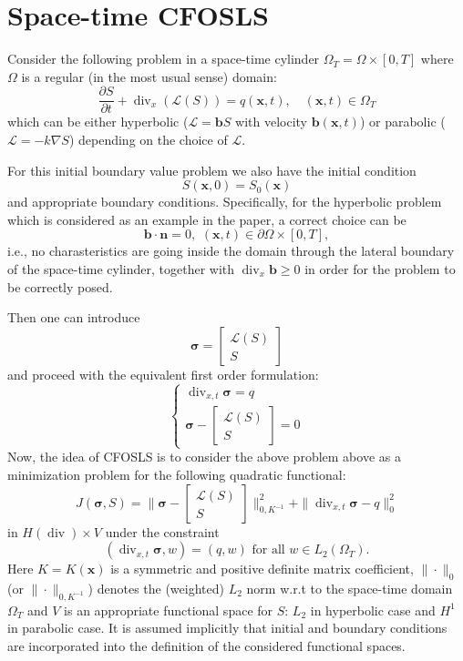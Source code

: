 \documentclass[12pt]{article}
\renewcommand{\div}{\operatorname{div}}
\def\bsigma{{\boldsymbol \sigma}}
\begin{document}
\section{Space-time CFOSLS}
Consider the following problem in a space-time cylinder $\Omega_T = \Omega \times [0, T]$ where $
\Omega$ is a regular (in the most usual sense) domain:
$$
\frac{\partial S}{\partial t} + \operatorname{div}_x \left( \mathcal{L}(S) \right) = q(\mathbf{x}, t), \quad (\mathbf{x},t) \in \Omega_T
$$
which can be either hyperbolic ($\mathcal{L} = \mathbf{b} S$ with velocity $\mathbf{b}(\mathbf{x}, t)$) or parabolic ($\mathcal{L} = - k \nabla S$) depending on the choice of $\mathcal{L}$.

For this initial boundary value problem we also have the initial condition
$$
S(\mathbf{x},0) = S_0(\mathbf{x})
$$
and appropriate boundary conditions. Specifically, for the hyperbolic problem which is considered as an example in the paper, a correct choice can be
$$
\mathbf{b} \cdot \mathbf{n} = 0, \, \, (\mathbf{x},t) \in \partial \Omega \times [0,T],
$$
i.e., no charasteristics are going inside the domain through the lateral boundary of the space-time cylinder,
together with $\operatorname{div}_{x} \mathbf{b} \geq 0$ in order for the problem to be correctly posed.

Then one can introduce 
$$
\bsigma = \left[ \begin{array}{c} \mathcal{L}(S) \\ S \end{array} \right]
$$
and proceed with the equivalent first order formulation:
$$
\left\{
\begin{array}{c}
\operatorname{div}_{x,t} \bsigma = q \\
\bsigma - 
\left[ 
\begin{array}{c} \mathcal{L}(S) \\ S \end{array}
\right] = 0
\end{array}
\right.
$$
Now, the idea of CFOSLS \cite{CFOSLS} is to consider the above problem above as a minimization problem for the following quadratic functional:
$$
J(\bsigma,S) = \| \bsigma - \left[ \begin{array}{c} \mathcal{L}(S) \\ S \end{array} \right] \|^2_{0,K^{-1}} + \| \operatorname{\div}_{x,t} \bsigma - q \|^2_0
$$
in $H(\div) \times V$ under the constraint
$$
(\operatorname{div}_{x,t} \bsigma, w) = (q, w) \, \, \text{for all} \, \, w \in L_2(\Omega_T).
$$
Here $K = K(\mathbf{x})$ is a symmetric and positive definite matrix coefficient, $\| \cdot \|_0$ (or $\| \cdot \|_{0,K^{-1}}$) denotes the (weighted) $L_2$ norm w.r.t to the space-time domain $\Omega_T$ and $V$ is an appropriate functional space for $S$: $L_2$ in hyperbolic case and $H^1$ in parabolic case. It is assumed implicitly that initial and boundary conditions are incorporated into the definition of the considered functional spaces.
\end{document}
